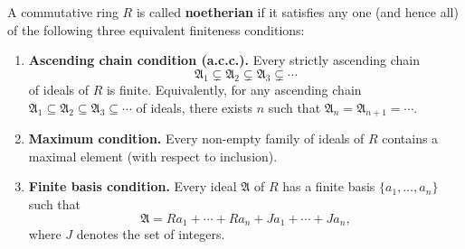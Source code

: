 A commutative ring $R$ is called \textbf{noetherian} if it satisfies any one (and hence all) of the following three equivalent finiteness conditions:

\begin{enumerate}
    \item[(a)] \textbf{Ascending chain condition (a.c.c.).} Every strictly ascending chain
    $$
    \mathfrak{A}_1 \subsetneq \mathfrak{A}_2 \subsetneq \mathfrak{A}_3 \subsetneq \cdots
    $$
    of ideals of $R$ is finite. Equivalently, for any ascending chain
    $\mathfrak{A}_1 \subseteq \mathfrak{A}_2 \subseteq \mathfrak{A}_3 \subseteq \cdots$
    of ideals, there exists $n$ such that $\mathfrak{A}_n = \mathfrak{A}_{n+1} = \cdots$.

    \item[(b)] \textbf{Maximum condition.} Every non-empty family of ideals of $R$ contains a maximal element (with respect to inclusion).

    \item[(c)] \textbf{Finite basis condition.} Every ideal $\mathfrak{A}$ of $R$ has a finite basis $\{a_1, \dots, a_n\}$ such that
    $$
    \mathfrak{A} = Ra_1 + \cdots + Ra_n + Ja_1 + \cdots + Ja_n,
    $$
    where $J$ denotes the set of integers.
\end{enumerate}
